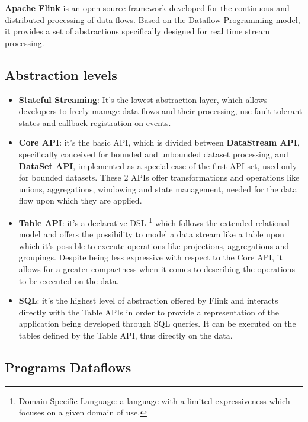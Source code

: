 \href{https://flink.apache.org/}{\textbf{Apache Flink}} \cite{flink_doc} is an open source framework developed for the continuous and distributed processing of data flows. Based on the Dataflow Programming model, it provides a set of abstractions specifically designed for real time stream processing.

\subsection{Abstraction levels}  \label{AbstractionLevels}

\begin{itemize}
	\item \textbf{Stateful Streaming}: It's the lowest abstraction layer, which allows developers to freely manage data flows and their processing, use fault-tolerant states and callback registration on events.
	\item \textbf{Core API}: it's the basic API, which is divided between \textbf{DataStream API}, specifically conceived for bounded and unbounded dataset processing, and \textbf{DataSet API}, implemented as a special case of the first API set, used only for bounded datasets. These 2 APIs offer transformations and operations like unions, aggregations, windowing and state management, needed for the data flow upon which they are applied.
	\item \textbf{Table API}: it's a declarative DSL \footnote{Domain Specific Language: a language with a limited expressiveness which focuses on a given domain of use.} which follows the extended relational model and offers the possibility to model a data stream like a table upon which it's possible to execute operations like projections, aggregations and groupings. Despite being less expressive with respect to the Core API, it allows for a greater compactness when it comes to describing the operations to be executed on the data.
	\item \textbf{SQL}: it's the highest level of abstraction offered by Flink and interacts directly with the Table APIs in order to provide a representation of the application being developed through SQL queries. It can be executed on the tables defined by the Table API, thus directly on the data.
\end{itemize}
\pagebreak
\subsection{Programs Dataflows}  \label{ProgramsDataflows}

